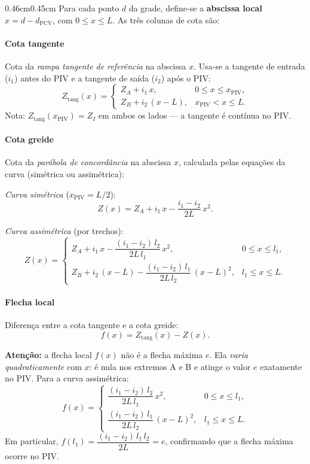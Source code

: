 \documentclass[12pt,letterpaper]{article}
\newenvironment{corpo}{\begin{adjustwidth}{0.46cm}{0.45cm}\justifying}{\end{adjustwidth}}
\begin{document}
\begin{corpo}
Para cada ponto $d$ da grade, define-se a \textbf{abscissa local} $x = d - d_{\mathrm{PCV}}$, com $0 \le x \le L$. As três colunas de cota são:

\paragraph*{Cota tangente}
Cota da \emph{rampa tangente de referência} na abscissa $x$. Usa-se a tangente de entrada ($i_1$) antes do PIV e a tangente de saída ($i_2$) após o PIV:
\[
 Z_{\mathrm{tang}}(x) =
 \begin{cases}
   Z_A + i_1\,x, & 0 \le x \le x_{\mathrm{PIV}}, \\[3pt]
   Z_B + i_2\,(x - L), & x_{\mathrm{PIV}} < x \le L.
 \end{cases}
\]
Nota: $Z_{\mathrm{tang}}(x_{\mathrm{PIV}}) = Z_I$ em ambos os lados --- a tangente é contínua no PIV.

\paragraph*{Cota greide}
Cota da \emph{parábola de concordância} na abscissa $x$, calculada pelas equações da curva (simétrica ou assimétrica):

\textit{Curva simétrica} ($x_{\mathrm{PIV}} = L/2$):
\[
 Z(x) = Z_A + i_1\,x - \frac{i_1 - i_2}{2L}\,x^2.
\]

\textit{Curva assimétrica} (por trechos):
\[
 Z(x) =
 \begin{cases}
   Z_A + i_1\,x - \dfrac{(i_1-i_2)\,l_2}{2L\,l_1}\,x^2, & 0 \le x \le l_1, \\[8pt]
   Z_B + i_2\,(x-L) - \dfrac{(i_1-i_2)\,l_1}{2L\,l_2}\,(x-L)^2, & l_1 \le x \le L.
 \end{cases}
\]

\paragraph*{Flecha local}
Diferença entre a cota tangente e a cota greide:
\[
 f(x) = Z_{\mathrm{tang}}(x) - Z(x).
\]

\textbf{Atenção:} a flecha local $f(x)$ não é a flecha máxima $e$. Ela \emph{varia quadraticamente} com $x$: é nula nos extremos A e B e atinge o valor $e$ exatamente no PIV. Para a curva assimétrica:
\[
 f(x) =
 \begin{cases}
   \dfrac{(i_1-i_2)\,l_2}{2L\,l_1}\,x^2, & 0 \le x \le l_1, \\[8pt]
   \dfrac{(i_1-i_2)\,l_1}{2L\,l_2}\,(x-L)^2, & l_1 \le x \le L.
 \end{cases}
\]
Em particular, $f(l_1) = \dfrac{(i_1-i_2)\,l_1\,l_2}{2L} = e$, confirmando que a flecha máxima ocorre no PIV.
\end{corpo}
\end{document}

